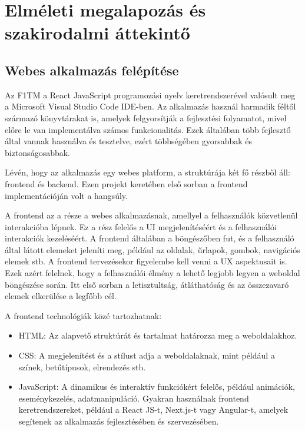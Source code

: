 \chapter{Elméleti megalapozás és szakirodalmi áttekintő}

\section {Webes alkalmazás felépítése}

Az F1TM a React JavaScript programozási nyelv keretrendszerével valósult meg a Microsoft Visual Studio Code IDE-ben. Az alkalmazás használ harmadik féltől származó könyvtárakat is, amelyek felgyorsítják a fejlesztési folyamatot, mivel előre le van implementálva számos funkcionalitás. Ezek általában több fejlesztő által vannak használva és tesztelve, ezért többségében gyorsabbak és biztonságosabbak.

Lévén, hogy az alkalmazás egy webes platform, a struktúrája két fő részből áll: frontend és backend. Ezen projekt keretében első sorban a frontend implementációján volt a hangsúly.

A frontend az a része a webes alkalmazásnak, amellyel a felhasználók közvetlenül interakcióba lépnek. Ez a rész felelős a UI megjelenítéséért és a felhasználói interakciók kezeléséért. A frontend általában a böngészőben fut, és a felhasználó által látott elemeket jeleníti meg, például az oldalak, űrlapok, gombok, navigációs elemek stb. A frontend tervezésekor figyelembe kell venni a UX aspektusait is. Ezek azért felelnek, hogy a felhasználói élmény a lehető legjobb legyen a weboldal böngészése során. Itt első sorban a letisztultság, átláthatóság és az összezavaró elemek elkerülése a legfőbb cél.

A frontend technológiák közé tartozhatnak:
\begin{itemize}
	\item HTML: Az alapvető struktúrát és tartalmat határozza meg a weboldalakhoz.
	\item CSS: A megjelenítést és a stílust adja a weboldalaknak, mint például a színek, betűtípusok, elrendezés stb.
	\item JavaScript: A dinamikus és interaktív funkciókért felelős, például animációk, eseménykezelés, adatmanipuláció. Gyakran használnak frontend keretrendszereket, például a React JS-t, Next.js-t vagy Angular-t, amelyek segítenek az alkalmazás fejlesztésében és szervezésében. 
\end{itemize}

